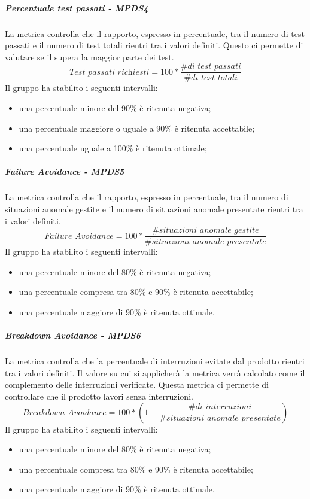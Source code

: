 \documentclass[PianoDiQualifica.tex]{subfiles}
\begin{document}
				
				\hypertarget{test_passati}{\subparagraph{Percentuale test passati  - MPDS4}}
				La metrica controlla che il rapporto, espresso in percentuale, tra il numero di test passati e il numero di test totali rientri tra i valori definiti. Questo ci permette
				di valutare se il  supera la maggior parte dei test. \\
				\begin{equation}\textit{Test passati richiesti} = 100 * \frac{\textit{\# di test passati}}{\textit{\# di test totali}}\end{equation}
				Il gruppo ha stabilito i seguenti intervalli:
				\begin{itemize}
					\item una percentuale minore del 90\% è ritenuta negativa;
					\item una percentuale maggiore o uguale a 90\% è ritenuta accettabile;
					\item una percentuale uguale a 100\% è ritenuta ottimale;
				\end{itemize}
				
				\hypertarget{failure}{\subparagraph{Failure Avoidance - MPDS5}}
				La metrica controlla che il rapporto, espresso in percentuale, tra il numero di situazioni anomale gestite e il numero di situazioni anomale presentate rientri tra i valori definiti.
				\begin{equation}\textit{Failure Avoidance} = 100 * \frac{\textit{\# situazioni anomale gestite}}{\textit{\# situazioni anomale presentate}}\end{equation}
				Il gruppo ha stabilito i seguenti intervalli:
				\begin{itemize}
					\item una percentuale minore del 80\% è ritenuta negativa;
					\item una percentuale compresa tra 80\% e 90\% è ritenuta accettabile;
					\item una percentuale maggiore di 90\% è ritenuta ottimale.
				\end{itemize}
				
				\hypertarget{breakdown}{\subparagraph{Breakdown Avoidance - MPDS6}}
				La metrica controlla che la percentuale di interruzioni evitate dal prodotto rientri tra i valori definiti. Il valore su cui si applicherà la metrica verrà calcolato come il
				complemento delle interruzioni verificate. Questa metrica ci permette di controllare che il prodotto lavori senza interruzioni.
				\begin{equation}\textit{Breakdown Avoidance} = 100 * \left ( 1 - \frac{\textit{\# di interruzioni}}{\textit{\# situazioni anomale presentate}} \right ) \end{equation}
				Il gruppo ha stabilito i seguenti intervalli:
				\begin{itemize}
					\item una percentuale minore del 80\% è ritenuta negativa;
					\item una percentuale compresa tra 80\% e 90\% è ritenuta accettabile;
					\item una percentuale maggiore di 90\% è ritenuta ottimale.
				\end{itemize}
				
\end{document}
